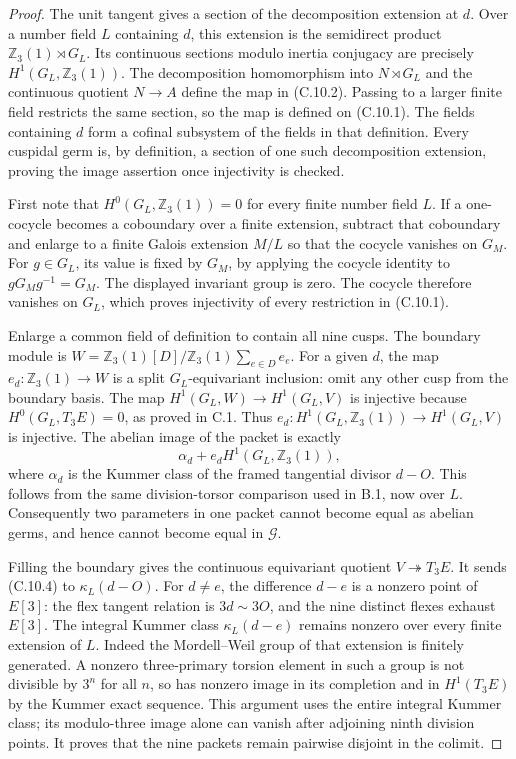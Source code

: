\begin{proof}
The unit tangent gives a section of the decomposition extension
at $d$.  Over a number field $L$ containing $d$, this extension
is the semidirect product $\mathbb Z_3(1)\rtimes G_L$.
Its continuous sections modulo inertia conjugacy are precisely
$H^1(G_L,\mathbb Z_3(1))$.  The decomposition homomorphism into
$N\rtimes G_L$ and the continuous quotient $N\to A$ define
the map in (C.10.2).  Passing to a larger finite field restricts
the same section, so the map is defined on (C.10.1).
The fields containing $d$ form a cofinal subsystem of the fields
in that definition.  Every cuspidal germ is, by definition, a
section of one such decomposition extension, proving the image
assertion once injectivity is checked.

First note that $H^0(G_L,\mathbb Z_3(1))=0$ for every finite
number field $L$.  If a one-cocycle becomes a coboundary over
a finite extension, subtract that coboundary and enlarge to a
finite Galois extension $M/L$ so that the cocycle vanishes on
$G_M$.  For $g\in G_L$, its value is fixed by $G_M$, by applying
the cocycle identity to $gG_Mg^{-1}=G_M$.  The displayed
invariant group is zero.  The cocycle therefore vanishes on
$G_L$, which proves injectivity of every restriction in
(C.10.1).

Enlarge a common field of definition to contain all nine cusps.
The boundary module is
$W=\mathbb Z_3(1)[D]/\mathbb Z_3(1)\sum_{e\in D}e_e$.
For a given $d$, the map $e_d:\mathbb Z_3(1)\to W$ is a
split $G_L$-equivariant inclusion: omit any other cusp from
the boundary basis.  The map $H^1(G_L,W)\to H^1(G_L,V)$
is injective because $H^0(G_L,T_3E)=0$, as proved in C.1.
Thus $e_d:H^1(G_L,\mathbb Z_3(1))\to H^1(G_L,V)$ is
injective.  The abelian image of the packet is exactly
\[
                   \alpha_d+e_d H^1(G_L,\mathbb Z_3(1)),     \tag{C.10.4}
\]
where $\alpha_d$ is the Kummer class of the framed tangential
divisor $d-O$.  This follows from the same division-torsor
comparison used in B.1, now over $L$.
Consequently two parameters in one packet cannot become
equal as abelian germs, and hence cannot become equal in
$\mathscr G$.

Filling the boundary gives the continuous equivariant quotient
$V\twoheadrightarrow T_3E$.  It sends (C.10.4) to
$\kappa_L(d-O)$.  For $d\ne e$, the difference $d-e$ is a
nonzero point of $E[3]$: the flex tangent relation is
$3d\sim3O$, and the nine distinct flexes exhaust $E[3]$.
The integral Kummer class $\kappa_L(d-e)$ remains nonzero
over every finite extension of $L$.  Indeed the
Mordell--Weil group of that extension is finitely generated.
A nonzero three-primary torsion element in such a group is
not divisible by $3^n$ for all $n$, so has nonzero image in
its completion and in $H^1(T_3E)$ by the Kummer exact sequence.
This argument uses the entire integral Kummer class; its
modulo-three image alone can vanish after adjoining ninth
division points.  It proves that the nine packets remain
pairwise disjoint in the colimit.


\end{proof}
